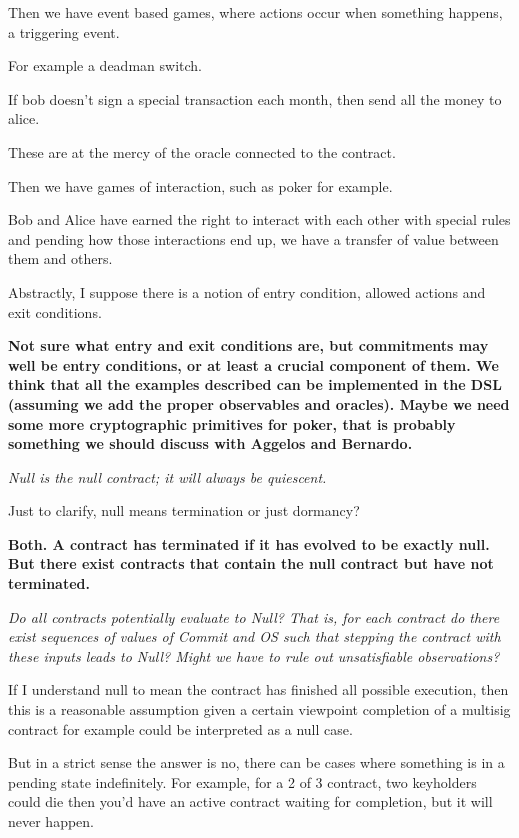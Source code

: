 \documentclass[
      acmsmall
    , screen
    , review=true
  ]{acmart}
\begin{document}
Then we have event based games, where actions occur when something happens, a triggering event.


For example a deadman switch.


If bob doesn't sign a special transaction each month, then send all the money to alice.


These are at the mercy of the oracle connected to the contract.


Then we have games of interaction, such as poker for example.


Bob and Alice have earned the right to interact with each other with special rules and pending how those interactions end up, we have a transfer of value between them and others.


Abstractly, I suppose there is a notion of entry condition, allowed actions and exit conditions.

{\bf
Not sure what entry and exit conditions are, but commitments may well be entry conditions, or at least a crucial component of them. We think that all the examples described can be implemented in the DSL (assuming we add the proper observables and oracles). Maybe we need some more cryptographic primitives for poker, that is probably something we should discuss with Aggelos and Bernardo.
}




{\it
Null is the null contract; it will always be quiescent.
}

Just to clarify, null means termination or just dormancy?

{\bf
Both. A contract has terminated if it has evolved to be exactly null. But there exist contracts that contain the null contract but have not terminated.
}

{\it
Do all contracts potentially evaluate to Null? That is, for each contract do there exist sequences of values of Commit and OS such that stepping the contract with these inputs leads to Null? Might we have to rule out unsatisfiable observations?
}

If I understand null to mean the contract has finished all possible execution, then this is a reasonable assumption given a certain viewpoint completion of a multisig contract for example could be interpreted as a null case.


But in a strict sense the answer is no, there can be cases where something is in a pending state indefinitely. For example, for a 2 of 3 contract, two keyholders could die then you'd have an active contract waiting for completion, but it will never happen.
\end{document}
